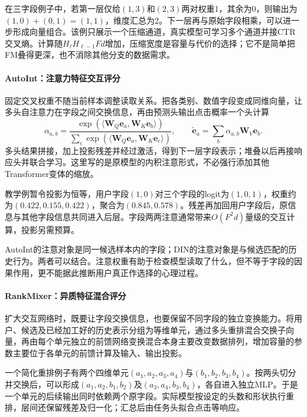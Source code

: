 在三字段例子中，若第一层仅给$(1,3)$和$(2,3)$两对权重1，其余为0，则输出为$(1,0)+(0,1)=(1,1)$，维度汇总为2。下一层再与原始字段相乘，可以进一步形成向量组合。该例只展示一个压缩通道，真实模型可学习多个通道并接CTR交叉熵。计算随$H_\ell H_{\ell-1}Fd$增加，压缩宽度是容量与代价的选择；它不是简单把FM叠得更深，也不消除其他分支的数据需求。

\paragraph{AutoInt：注意力特征交互评分}
\label{sec:rs-autoint}

固定交叉权重不随当前样本调整读取关系。把各类别、数值字段变成同维向量，让多头自注意力在字段之间交换信息，再由预测头输出点击概率一个头计算
\[
 \alpha_{a,b}=
 \frac{\exp(\langle\bm W_Q\bm e_a,\bm W_K\bm e_b\rangle)}
      {\sum_c\exp(\langle\bm W_Q\bm e_a,\bm W_K\bm e_c\rangle)},
 \qquad
 \widetilde{\bm e}_a=\sum_b\alpha_{a,b}\bm W_V\bm e_b.
\]
多头结果拼接，加上投影残差并经过激活，得到下一层字段表示；堆叠以后再接响应头并联合学习。这里写的是原模型的内积注意形式，不必强行添加其他Transformer变体的缩放。

教学例暂令投影为恒等，用户字段$(1,0)$对三个字段的logit为$(1,0,1)$，权重约为$(0.422,0.155,0.422)$，聚合为$(0.845,0.578)$。残差再加回用户字段后，原信息与其他字段信息共同进入后层。字段两两注意通常带来$O(F^2d)$量级的交互计算，投影另需预算。

AutoInt的注意对象是同一候选样本内的字段；DIN的注意对象是与候选匹配的历史行为。两者可以结合。注意权重有助于检查模型读取了什么，但不等于字段的因果作用，更不能据此推断用户真正作选择的心理过程。

\paragraph{RankMixer：异质特征混合评分}
\label{sec:rs-rankmixer}

扩大交互网络时，既要让字段交换信息，也要保留不同字段的独立变换能力。将用户、候选及已经加工好的历史表示分组为等维单元，通过多头重排混合交换子向量，再由每个单元独立的前馈网络变换混合本身主要改变数据排列，增加容量的参数主要位于各单元的前馈计算及输入、输出投影。

一个简化重排例子有两个四维单元$(a_1,a_2,a_3,a_4)$与$(b_1,b_2,b_3,b_4)$。按两头切分并交换后，可以形成$(a_1,a_2,b_1,b_2)$及$(a_3,a_4,b_3,b_4)$，各自进入独立MLP。于是一个单元的后续输出同时依赖两个原字段。实际模型按设定的头数和形状执行重排，层间还保留残差及归一化；汇总后由任务头拟合点击等响应。

